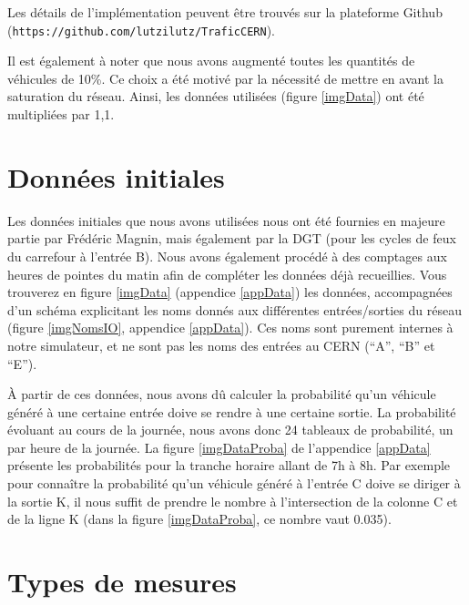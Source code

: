 \documentclass[a4paper,11pt, titlepage]{extarticle}
\begin{document}
Les détails de l'implémentation peuvent être trouvés sur la plateforme Github\\(\texttt{https://github.com/lutzilutz/TraficCERN}).

\vspace{0.4cm}

Il est également à noter que nous avons augmenté toutes les quantités de véhicules de 10\%. Ce choix a été motivé par la nécessité de mettre en avant la saturation du réseau. Ainsi, les données utilisées (figure \ref{imgData}) ont été multipliées par 1,1.

\newpage

\section{Données initiales}

Les données initiales que nous avons utilisées nous ont été fournies en majeure partie par Frédéric Magnin, mais également par la DGT (pour les cycles de feux du carrefour à l'entrée B). Nous avons également procédé à des comptages aux heures de pointes du matin afin de compléter les données déjà recueillies. Vous trouverez en figure \ref{imgData} (appendice \ref{appData}) les données, accompagnées d'un schéma explicitant les noms donnés aux différentes entrées/sorties du réseau (figure \ref{imgNomsIO}, appendice \ref{appData}). Ces noms sont purement internes à notre simulateur, et ne sont pas les noms des entrées au CERN (``A'', ``B'' et ``E'').

\vspace{0.4cm}

À partir de ces données, nous avons dû calculer la probabilité qu'un véhicule généré à une certaine entrée doive se rendre à une certaine sortie. La probabilité évoluant au cours de la journée, nous avons donc 24 tableaux de probabilité, un par heure de la journée. La figure \ref{imgDataProba} de l'appendice \ref{appData} présente les probabilités pour la tranche horaire allant de 7h à 8h. Par exemple pour connaître la probabilité qu'un véhicule généré à l'entrée C doive se diriger à la sortie K, il nous suffit de prendre le nombre à l'intersection de la colonne C et de la ligne K (dans la figure \ref{imgDataProba}, ce nombre vaut 0.035).

\newpage

\section{Types de mesures}
\end{document}
